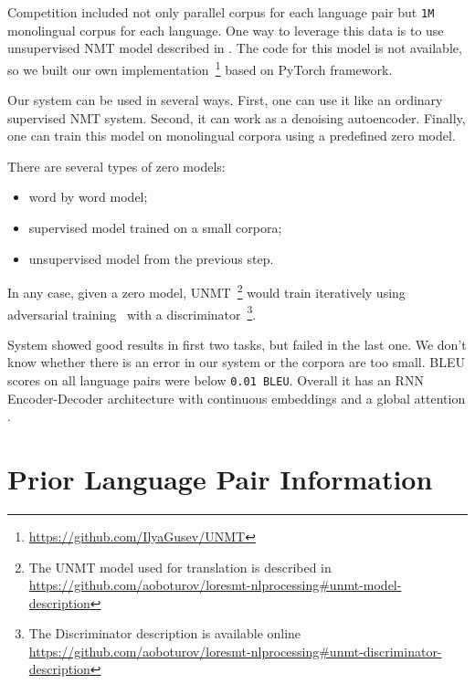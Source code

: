\documentclass[]{article}
\begin{document}
Competition included not only parallel corpus for each language pair but  {\tt 1M} monolingual corpus for each language.
One way to leverage this data is to use unsupervised NMT model described in \cite{DBLP:journals/corr/abs-1711-00043}.
The code for this model is not available, so we built our own implementation~\footnote{\url{https://github.com/IlyaGusev/UNMT}} based on PyTorch framework. 

Our system can be used in several ways.
First, one can use it like an ordinary supervised NMT system.
Second, it can work as a denoising autoencoder.
Finally, one can train this model on monolingual corpora using a predefined zero model.

There are several types of zero models:
\begin{itemize}
\item word by word model;
\item supervised model trained on a small corpora;
\item unsupervised model from the previous step.
\end{itemize}

In any case, given a zero model, UNMT~\footnote{The UNMT model used for translation is described in \url{https://github.com/aoboturov/loresmt-nlprocessing\#unmt-model-description}} would train iteratively using adversarial training~\citep{goodfellow2016nips} with a discriminator~\footnote{The Discriminator description is available online \url{https://github.com/aoboturov/loresmt-nlprocessing\#unmt-discriminator-description}}.

System showed good results in first two tasks, but failed in the last one.
We don't know whether there is an error in our system or the corpora are too small.
BLEU scores on all language pairs were below {\tt 0.01 BLEU}.
Overall it has an RNN Encoder-Decoder architecture \citep{DBLP:journals/corr/ChoMGBSB14} with continuous embeddings and a global attention \citep{luong2015effective}.

\section{Prior Language Pair Information}
\label{sect:nonoblivious}
\end{document}
